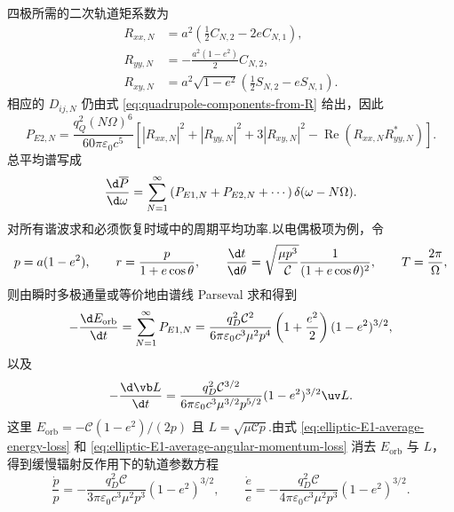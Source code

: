 四极所需的二次轨道矩系数为
\begin{equation}
 \begin{aligned}
 R_{xx,N}&=a^2\left(\frac{1}{2}C_{N,2}-2eC_{N,1}\right),\\
 R_{yy,N}&=-\frac{a^2(1-e^2)}{2}C_{N,2},\\
 R_{xy,N}&=a^2\sqrt{1-e^2}
 \left(\frac{1}{2}S_{N,2}-eS_{N,1}\right).
 \end{aligned}
 \label{eq:elliptic-quadratic-Fourier}
\end{equation}
相应的 $D_{ij,N}$ 仍由式 \eqref{eq:quadrupole-components-from-R} 给出，因此
\begin{equation}
 P_{E2,N}
 =\frac{q_Q^2(N\Omega)^6}{60\pi\varepsilon_0c^5}
 \left[
 |R_{xx,N}|^2+|R_{yy,N}|^2+3|R_{xy,N}|^2
 -\operatorname{Re}(R_{xx,N}R_{yy,N}^*)
 \right].
 \label{eq:elliptic-E2-line-power}
\end{equation}
总平均谱写成
\begin{equation}
 \frac{\d\overline P}{\d\omega}
 =\sum_{N=1}^{\infty}
 \left(P_{E1,N}+P_{E2,N}+\cdots\right)
 \delta(\omega-N\Omega).
\end{equation}
对所有谐波求和必须恢复时域中的周期平均功率.以电偶极项为例，令
\begin{equation}
 p=a(1-e^2),
 \qquad
 r=\frac{p}{1+e\cos\theta},
 \qquad
 \frac{\d t}{\d\theta}
 =\sqrt{\frac{\mu p^3}{\mathcal C}}
 \frac{1}{(1+e\cos\theta)^2},
 \qquad
 T=\frac{2\pi}{\Omega},
\end{equation}
则由瞬时多极通量或等价地由谱线 Parseval 求和得到
\begin{equation}
 -\frac{\d E_{\mathrm{orb}}}{\d t}
 =\sum_{N=1}^{\infty}P_{E1,N}
 =\frac{q_D^2\mathcal C^2}
 {6\pi\varepsilon_0c^3\mu^2p^4}
 \left(1+\frac{e^2}{2}\right)(1-e^2)^{3/2},
 \label{eq:elliptic-E1-average-energy-loss}
\end{equation}
以及
\begin{equation}
 -\frac{\d\vb L}{\d t}
 =\frac{q_D^2\mathcal C^{3/2}}
 {6\pi\varepsilon_0c^3\mu^{3/2}p^{5/2}}
 (1-e^2)^{3/2}\uv L.
 \label{eq:elliptic-E1-average-angular-momentum-loss}
\end{equation}
这里 $E_{\mathrm{orb}}=-\mathcal C(1-e^2)/(2p)$ 且 $L=\sqrt{\mu\mathcal C p}$.由式 \eqref{eq:elliptic-E1-average-energy-loss} 和 \eqref{eq:elliptic-E1-average-angular-momentum-loss} 消去 $E_{\mathrm{orb}}$ 与 $L$，得到缓慢辐射反作用下的轨道参数方程
\begin{equation}
 \frac{\dot p}{p}
 =-\frac{q_D^2\mathcal C}{3\pi\varepsilon_0c^3\mu^2p^3}(1-e^2)^{3/2},
 \qquad
 \frac{\dot e}{e}
 =-\frac{q_D^2\mathcal C}{4\pi\varepsilon_0c^3\mu^2p^3}(1-e^2)^{3/2}.
 \label{eq:elliptic-E1-secular-p-e}
\end{equation}
